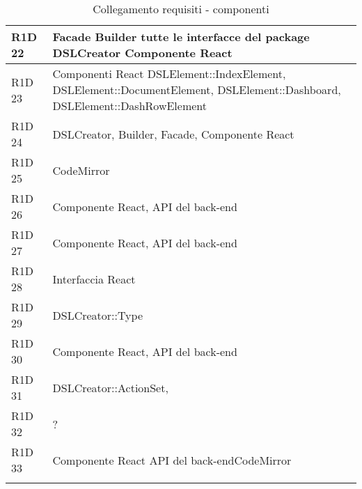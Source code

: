 \begin{center}
\begin{longtable}{ | l | p{8cm} |}
	R1D 22 & Facade \newline Builder \newline tutte le interfacce del package DSLCreator \newline Componente React \\ \hline

	R1D 23 & Componenti React \newline DSLElement::IndexElement, DSLElement::DocumentElement, DSLElement::Dashboard, DSLElement::DashRowElement \\ \hline

	R1D 24 & DSLCreator, Builder, Facade, Componente React \\ \hline
 
	R1D 25 & CodeMirror \\ \hline

	R1D 26 & Componente React, API del back-end \\ \hline

	R1D 27 & Componente React, API del back-end \\ \hline

	R1D 28 & Interfaccia React \\ \hline

	R1D 29 & DSLCreator::Type \\ \hline

	R1D 30 & Componente React, API del back-end \\ \hline

	R1D 31 & DSLCreator::ActionSet, \\ \hline

	R1D 32 & ? \\ \hline

	R1D 33 & Componente React \newline API del back-endCodeMirror \\ \hline
        
    \caption{Collegamento requisiti - componenti}
  \end{longtable}
  \egroup
\end{center} 
